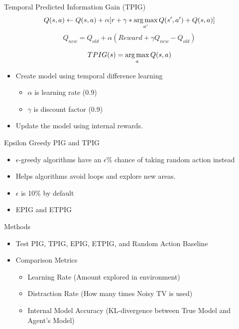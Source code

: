 	\begin{frame}[fragile]{Temporal Predicted Information Gain (TPIG)}
		\[Q(s,a) \leftarrow Q(s,a) + \alpha [r + \gamma *  \operatorname*{arg\,max}_{a'} Q(s',a') + Q(s,a)]\]
		\[Q_{new} = Q_{old} + \alpha(Reward + \gamma Q_{new} - Q_{old})\]
		
		\[ TPIG(s) = \operatorname*{arg\,max}_a  Q(s,a)\]
		\begin{itemize}
			\item Create model using temporal difference learning
			\begin{itemize}
				\item {$\alpha$ is learning rate (0.9)}
				\item {$\gamma$ is discount factor (0.9)}
			\end{itemize}
			\item Update the model using internal rewards.
		\end{itemize}
	\end{frame}
	
		
	
	\begin{frame}[fragile]{Epsilon Greedy PIG and TPIG}
		\begin{itemize}
			\item {$\epsilon$-greedy algorithms have an $\epsilon$\% chance of taking random action instead}
			\item {Helps algorithms avoid loops and explore new areas.}
			\item {$\epsilon$ is 10\% by default}
			\item {EPIG and ETPIG}
		\end{itemize}
	\end{frame}
	
	\begin{frame}[fragile]{Methods}
		\begin{itemize}
			\item {Test PIG, TPIG, EPIG, ETPIG, and Random Action Baseline}
			\item {Comparison Metrics}
			\begin{itemize}
				\item {Learning Rate (Amount explored in environment)}
				\item {Distraction Rate (How many times Noisy TV is used)}
				\item {Internal Model Accuracy (KL-divergence between True Model and Agent's Model)}
			\end{itemize}
		\end{itemize}
	\end{frame}
	
